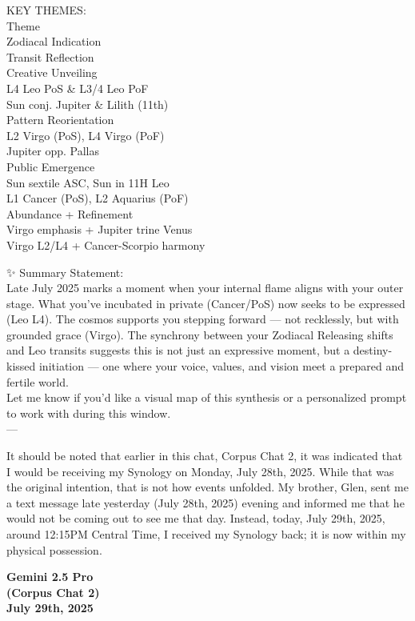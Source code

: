 \documentclass{article}
\begin{document}
 KEY THEMES:\\
Theme\\
Zodiacal Indication\\
Transit Reflection\\
Creative Unveiling\\
L4 Leo PoS \& L3/4 Leo PoF\\
Sun conj. Jupiter \& Lilith (11th)\\
Pattern Reorientation\\
L2 Virgo (PoS), L4 Virgo (PoF)\\
Jupiter opp. Pallas\\
Public Emergence\\
Sun sextile ASC, Sun in 11H Leo\\
L1 Cancer (PoS), L2 Aquarius (PoF)\\
Abundance + Refinement\\
Virgo emphasis + Jupiter trine Venus\\
Virgo L2/L4 + Cancer-Scorpio harmony

✨ Summary Statement:\\
Late July 2025 marks a moment when your internal flame aligns with your
outer stage. What you've incubated in private (Cancer/PoS) now seeks to
be expressed (Leo L4). The cosmos supports you stepping forward --- not
recklessly, but with grounded grace (Virgo). The synchrony between your
Zodiacal Releasing shifts and Leo transits suggests this is not just an
expressive moment, but a destiny-kissed initiation --- one where your
voice, values, and vision meet a prepared and fertile world.\\
Let me know if you'd like a visual map of this synthesis or a
personalized prompt to work with during this window.\\
---

It should be noted that earlier in this chat, Corpus Chat 2, it was
indicated that I would be receiving my Synology on Monday, July 28th,
2025. While that was the original intention, that is not how events
unfolded. My brother, Glen, sent me a text message late yesterday (July
28th, 2025) evening and informed me that he would not be coming out to
see me that day. Instead, today, July 29th, 2025, around 12:15PM Central
Time, I received my Synology back; it is now within my physical
possession.

\begin{center}
\textbf{Gemini 2.5 Pro}\\
\textbf{(Corpus Chat 2)}\\
\textbf{July 29th, 2025}
\end{center}
\end{document}
